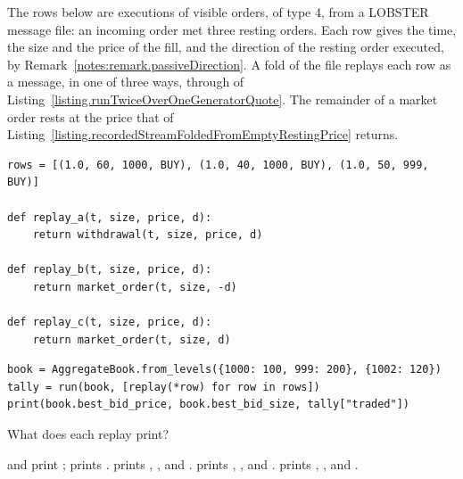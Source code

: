 \begin{question}
\label{question.lobsterExecutionsReplayed}
The rows below are executions of visible orders, of type 4, from a LOBSTER message file:
an incoming order met three resting orders.
Each row gives the time, the size and the price of the fill,
and the direction of the resting order executed,
by Remark~\ref{notes:remark.passiveDirection}.
A fold of the file replays each row as a message, in one of three ways,
through  of Listing~\ref{listing.runTwiceOverOneGeneratorQuote}.
The remainder of a market order rests at the price
that  of Listing~\ref{listing.recordedStreamFoldedFromEmptyRestingPrice}
returns.
\begin{lstlisting}[caption={Three replays of an execution}, label=listing.lobsterExecutionsReplayedReplays]
rows = [(1.0, 60, 1000, BUY), (1.0, 40, 1000, BUY), (1.0, 50, 999, BUY)]

def replay_a(t, size, price, d):
    return withdrawal(t, size, price, d)

def replay_b(t, size, price, d):
    return market_order(t, size, -d)

def replay_c(t, size, price, d):
    return market_order(t, size, d)
\end{lstlisting}
\begin{lstlisting}[caption={Run once with each replay}, label=listing.lobsterExecutionsReplayedRun]
book = AggregateBook.from_levels({1000: 100, 999: 200}, {1002: 120})
tally = run(book, [replay(*row) for row in rows])
print(book.best_bid_price, book.best_bid_size, tally["traded"])
\end{lstlisting}
What does each replay print?
\begin{choices}
 \choice {} and  print ;
   prints .
 \choice {} prints ,  ,
  and  .
 \correctchoice {} prints ,  ,
  and  .
 \choice {} prints ,  ,
  and  .
\end{choices}
\end{question}

